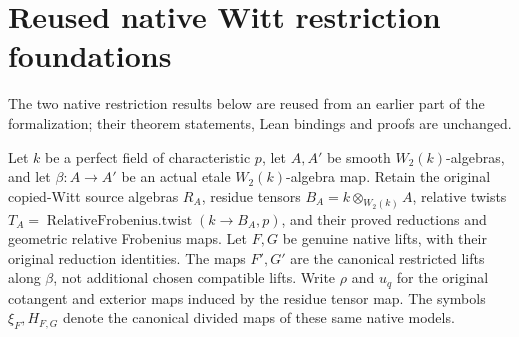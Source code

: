 \section{Reused native Witt restriction foundations}
\label{sec:di-reused-native-witt-foundations}

The two native restriction results below are reused from an earlier part of the formalization; their theorem
statements, Lean bindings and proofs are unchanged.

Let $k$ be a perfect field of characteristic $p$, let $A,A'$ be smooth
$W_2(k)$-algebras, and let $\beta:A\to A'$ be an actual etale
$W_2(k)$-algebra map. Retain the original copied-Witt source algebras
$R_A$, residue tensors $B_A=k\otimes_{W_2(k)}A$, relative twists
$T_A=\operatorname{RelativeFrobenius.twist}(k\to B_A,p)$, and their
proved reductions and geometric relative Frobenius maps. Let $F,G$
be genuine native lifts, with their original reduction identities.
The maps $F',G'$ are the canonical restricted lifts along $\beta$,
not additional chosen compatible lifts. Write $\rho$ and $u_q$ for
the original cotangent and exterior maps induced by the residue tensor
map. The symbols $\xi_F,H_{F,G}$ denote the canonical divided maps
of these same native models.

